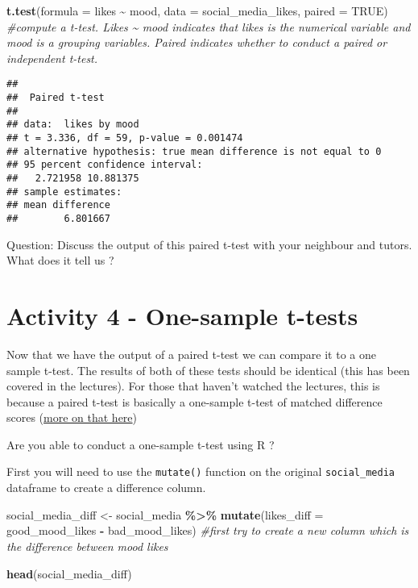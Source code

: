 \documentclass[
]{book}
\newenvironment{Shaded}{\begin{snugshade}}{\end{snugshade}}
\newcommand{\AttributeTok}[1]{\textcolor[rgb]{0.13,0.29,0.53}{#1}}
\newcommand{\CommentTok}[1]{\textcolor[rgb]{0.56,0.35,0.01}{\textit{#1}}}
\newcommand{\ConstantTok}[1]{\textcolor[rgb]{0.56,0.35,0.01}{#1}}
\newcommand{\FunctionTok}[1]{\textcolor[rgb]{0.13,0.29,0.53}{\textbf{#1}}}
\newcommand{\NormalTok}[1]{#1}
\newcommand{\OtherTok}[1]{\textcolor[rgb]{0.56,0.35,0.01}{#1}}
\newcommand{\SpecialCharTok}[1]{\textcolor[rgb]{0.81,0.36,0.00}{\textbf{#1}}}
\begin{document}
\begin{Shaded}
\begin{Highlighting}[]
\FunctionTok{t.test}\NormalTok{(}\AttributeTok{formula =}\NormalTok{ likes }\SpecialCharTok{\textasciitilde{}}\NormalTok{ mood, }\AttributeTok{data =}\NormalTok{ social\_media\_likes, }\AttributeTok{paired =} \ConstantTok{TRUE}\NormalTok{)  }\CommentTok{\#compute a t{-}test. Likes \textasciitilde{} mood indicates that likes is the numerical variable and mood is a grouping variables. Paired indicates whether to conduct a paired or independent t{-}test.}
\end{Highlighting}
\end{Shaded}

\begin{verbatim}
## 
##  Paired t-test
## 
## data:  likes by mood
## t = 3.336, df = 59, p-value = 0.001474
## alternative hypothesis: true mean difference is not equal to 0
## 95 percent confidence interval:
##   2.721958 10.881375
## sample estimates:
## mean difference 
##        6.801667
\end{verbatim}

Question: Discuss the output of this paired t-test with your neighbour and tutors. What does it tell us ?

\section{Activity 4 - One-sample t-tests}\label{activity-4---one-sample-t-tests}

Now that we have the output of a paired t-test we can compare it to a one sample t-test. The results of both of these tests should be identical (this has been covered in the lectures). For those that haven't watched the lectures, this is because a paired t-test is basically a one-sample t-test of matched difference scores (\href{https://statisticsbyjim.com/hypothesis-testing/t-tests-1-sample-2-sample-paired-t-tests/}{more on that here})

Are you able to conduct a one-sample t-test using R ?

First you will need to use the \texttt{mutate()} function on the original \texttt{social\_media} dataframe to create a difference column.

\begin{Shaded}
\begin{Highlighting}[]
\NormalTok{social\_media\_diff }\OtherTok{\textless{}{-}}\NormalTok{ social\_media }\SpecialCharTok{\%\textgreater{}\%} 
  \FunctionTok{mutate}\NormalTok{(}\AttributeTok{likes\_diff =}\NormalTok{ good\_mood\_likes }\SpecialCharTok{{-}}\NormalTok{ bad\_mood\_likes) }\CommentTok{\#first try to create a new column which is the difference between mood likes}

\FunctionTok{head}\NormalTok{(social\_media\_diff)}
\end{Highlighting}
\end{Shaded}
\end{document}
